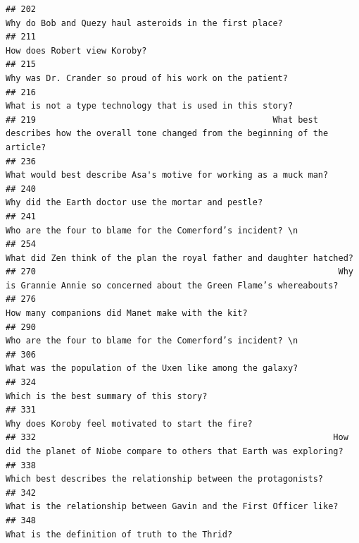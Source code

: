 \documentclass[
]{article}
\begin{document}
\begin{verbatim}
## 202                                                                           Why do Bob and Quezy haul asteroids in the first place?
## 211                                                                                                      How does Robert view Koroby?
## 215                                                                          Why was Dr. Crander so proud of his work on the patient?
## 216                                                                         What is not a type technology that is used in this story?
## 219                                               What best describes how the overall tone changed from the beginning of the article?
## 236                                                                  What would best describe Asa's motive for working as a muck man?
## 240                                                                               Why did the Earth doctor use the mortar and pestle?
## 241                                                                        Who are the four to blame for the Comerford’s incident? \n
## 254                                                             What did Zen think of the plan the royal father and daughter hatched?
## 270                                                            Why is Grannie Annie so concerned about the Green Flame’s whereabouts?
## 276                                                                                  How many companions did Manet make with the kit?
## 290                                                                        Who are the four to blame for the Comerford’s incident? \n
## 306                                                                        What was the population of the Uxen like among the galaxy?
## 324                                                                                          Which is the best summary of this story?
## 331                                                                                 Why does Koroby feel motivated to start the fire?
## 332                                                           How did the planet of Niobe compare to others that Earth was exploring?
## 338                                                                   Which best describes the relationship between the protagonists?
## 342                                                                What is the relationship between Gavin and the First Officer like?
## 348                                                                                     What is the definition of truth to the Thrid?

\end{verbatim}
\end{document}
